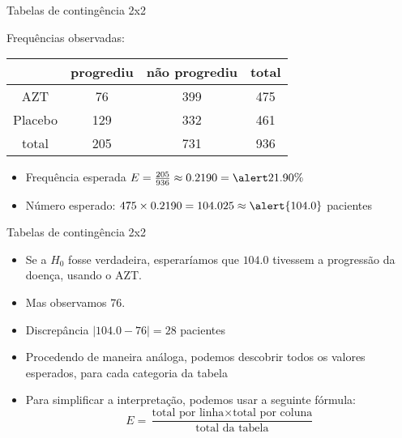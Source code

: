\documentclass{beamer}
\begin{document}
\begin{frame}{Tabelas de contingência 2x2}
  \begin{example}
    Frequências observadas:
    \begin{tabular}{c|c|c|c}
      & progrediu & não progrediu & total\\
      \hline
      AZT & 76 & 399 & 475\\
      \hline
      Placebo & 129 & 332 & 461\\
      \hline
      total & \alert{205} & 731 & \alert{936}\\
    \end{tabular}
  \end{example}
  \begin{itemize}
  \item Frequência esperada $E = \frac{205}{936} \approx 0.2190 = \alert{21.90\%}$
  \item Número esperado: $475 \times 0.2190 = 104.025 \approx \alert{104.0}$
    pacientes
  \end{itemize}
\end{frame}

\begin{frame}{Tabelas de contingência 2x2}
  \begin{itemize}
  \item Se a $H_0$ fosse verdadeira, esperaríamos que $104.0$ tivessem
    a progressão da doença, usando o AZT.
  \item Mas observamos 76.
  \item Discrepância $|104.0 - 76| = 28$ pacientes
  \item Procedendo de maneira análoga, podemos descobrir todos os
    valores esperados, para cada categoria da tabela
  \item Para simplificar a interpretação, podemos usar a seguinte fórmula:
  \begin{displaymath}
    E = \frac{ \text{total por linha} \times \text{total por coluna}
    }{ \text{total da tabela} }
  \end{displaymath}
  \end{itemize}
\end{frame}
\end{document}
